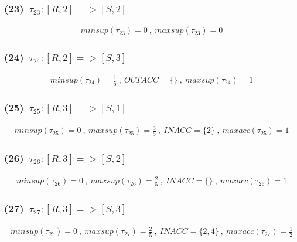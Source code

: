 \documentclass[a4paper,12pt]{jarticle}
\begin{document}
\subsubsection*{(23)~$\tau_{23}:[R,2]=>[S,2]$}
\vspace{-4mm}
%
\begin{align*}
 minsup(\tau_{23})=0~,~maxsup(\tau_{23})=0
\end{align*}
%
\vspace{-10mm}
\subsubsection*{(24)~$\tau_{24}:[R,2]=>[S,3]$}
\vspace{-4mm}
%
\begin{align*}
 minsup(\tau_{24})=\frac{1}{5}~,~OUTACC=\{\}~,~maxsup(\tau_{24})=1
\end{align*}
%
\vspace{-10mm}
\subsubsection*{(25)~$\tau_{25}:[R,3]=>[S,1]$}
\vspace{-4mm}
%
\begin{align*}
 minsup(\tau_{25})=0~,~maxsup(\tau_{25})=\frac{3}{5}~,~INACC=\{2\}~,~maxacc(\tau_{25})=1
\end{align*}
%
\vspace{-10mm}
\subsubsection*{(26)~$\tau_{26}:[R,3]=>[S,2]$}
\vspace{-4mm}
%
\begin{align*}
 minsup(\tau_{26})=0~,~maxsup(\tau_{26})=\frac{2}{5}~,~INACC=\{\}~,~maxacc(\tau_{26})=1
\end{align*}
%
\vspace{-10mm}
\subsubsection*{(27)~$\tau_{27}:[R,3]=>[S,3]$}
\vspace{-4mm}
%
\begin{align*}
 minsup(\tau_{27})=0~,~maxsup(\tau_{27})=\frac{2}{5}~,~INACC=\{2,4\}~,~maxacc(\tau_{27})=\frac{1}{2}
\end{align*}
%
\vspace{-10mm}
\end{document}
